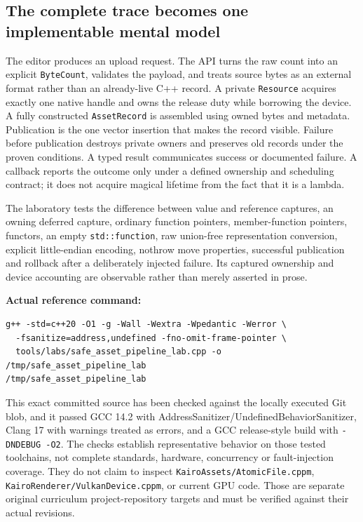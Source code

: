 \subsection{The complete trace becomes one implementable mental model}\label{05-engine-i-ch004-the-complete-trace-becomes-one-implementable-mental-model}

The editor produces an upload request. The API turns the raw count into an explicit \texttt{ByteCount}, validates the payload, and treats source bytes as an external format rather than an already-live C++ record. A private \texttt{Resource} acquires exactly one native handle and owns the release duty while borrowing the device. A fully constructed \texttt{AssetRecord} is assembled using owned bytes and metadata. Publication is the one vector insertion that makes the record visible. Failure before publication destroys private owners and preserves old records under the proven conditions. A typed result communicates success or documented failure. A callback reports the outcome only under a defined ownership and scheduling contract; it does not acquire magical lifetime from the fact that it is a lambda.

The laboratory tests the difference between value and reference captures, an owning deferred capture, ordinary function pointers, member-function pointers, functors, an empty \texttt{std::function}, raw union-free representation conversion, explicit little-endian encoding, nothrow move properties, successful publication and rollback after a deliberately injected failure. Its captured ownership and device accounting are observable rather than merely asserted in prose.

\textbf{Actual reference command:}

\begin{verbatim}
g++ -std=c++20 -O1 -g -Wall -Wextra -Wpedantic -Werror \
  -fsanitize=address,undefined -fno-omit-frame-pointer \
  tools/labs/safe_asset_pipeline_lab.cpp -o /tmp/safe_asset_pipeline_lab
/tmp/safe_asset_pipeline_lab
\end{verbatim}

This exact committed source has been checked against the locally executed Git blob, and it passed GCC 14.2 with AddressSanitizer/UndefinedBehaviorSanitizer, Clang 17 with warnings treated as errors, and a GCC release-style build with \texttt{-DNDEBUG\ -O2}. The checks establish representative behavior on those tested toolchains, not complete standards, hardware, concurrency or fault-injection coverage. They do not claim to inspect \texttt{KairoAssets/AtomicFile.cppm}, \texttt{KairoRenderer/VulkanDevice.cppm}, or current GPU code. Those are separate original curriculum project-repository targets and must be verified against their actual revisions.

